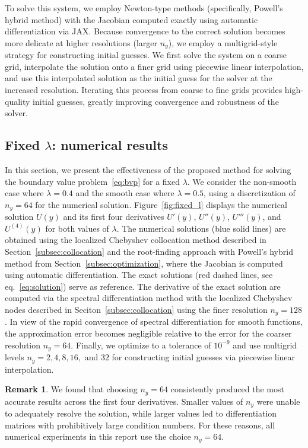 \documentclass[12pt]{article}
\theoremstyle{definition}\newtheorem{lemma}{Lemma}
\newtheorem{remark}{Remark}
\begin{document}
To solve this system, we employ Newton-type methods (specifically, Powell's hybrid method) with the Jacobian computed exactly using automatic differentiation via JAX. Because convergence to the correct solution becomes more delicate at higher resolutions (larger $n_y$), we employ a multigrid-style strategy for constructing initial guesses. We first solve the system on a coarse grid, interpolate the solution onto a finer grid using piecewise linear interpolation, and use this interpolated solution as the initial guess for the solver at the increased resolution. Iterating this process from coarse to fine grids provides high-quality initial guesses, greatly improving convergence and robustness of the solver.

\subsection{Fixed $\lambda$: numerical results}\label{subsec:fixed_l_numerical_results}
In this section, we present the effectiveness of the proposed method for solving the boundary value problem~\eqref{eq:bvp} for a fixed $\lambda$. We consider the non-smooth case where $\lambda = 0.4$ and the smooth case where $\lambda = 0.5$, using a discretization of $n_y = 64$ for the numerical solution. Figure~\ref{fig:fixed_l} displays the numerical solution $U(y)$ and its first four derivatives $U'(y)$, $U''(y)$, $U'''(y)$, and $U^{(4)}(y)$ for both values of $\lambda$. The numerical solutions (blue solid lines) are obtained using the localized Chebyshev collocation method described in Section~\ref{subsec:collocation} and the root-finding approach with Powell's hybrid method from Section~\ref{subsec:optimization}, where the Jacobian is computed using automatic differentiation. The exact solutions (red dashed lines, see eq.~\eqref{eq:solution}) serve as reference. 
The derivative of the exact solution are computed via the spectral differentiation method with the localized Chebyshev nodes described in Seciton~\ref{subsec:collocation} using the finer resolution $n_y = 128$. In view of the rapid convergence of spectral differentiation for smooth functions, the approximation error becomes negligible relative to the error for the coarser resolution $n_y = 64$.
Finally, we optimize to a tolerance of $10^{-9}$ and use multigrid levels $n_y = 2, 4, 8, 16,$ and $32$ for constructing initial guesses via piecewise linear interpolation.

\begin{remark}\label{rmk:n_y-selection}
    We found that choosing $n_y = 64$ consistently produced the most accurate results across the first four derivatives. Smaller values of $n_y$ were unable to adequately resolve the solution, while larger values led to differentiation matrices with prohibitively large condition numbers. For these reasons, all numerical experiments in this report use the choice $n_y = 64$.
\end{remark}
\end{document}
